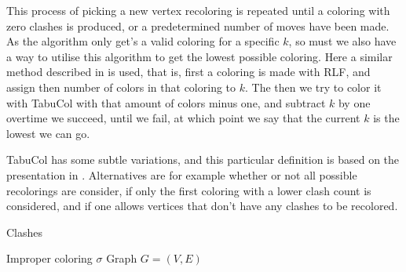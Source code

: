 \documentclass[a4paper]{article}
\begin{document}
This process of picking a new vertex recoloring is repeated until a coloring
with zero clashes is produced, or a predetermined number of moves have been
made. As the algorithm only get's a valid coloring for a specific $k$, so must
we also have a way to utilise this algorithm to get the lowest possible
coloring.  Here a similar method described in \cite{Constructive} is used, that
is, first a coloring is made with RLF, and assign then number of colors in that
coloring to $k$.  The then we try to color it with TabuCol with that amount of
colors minus one, and subtract $k$ by one overtime we succeed, until we fail, at
which point we say that the current $k$ is the lowest we can go.

TabuCol has some subtle variations, and this particular definition is based on
the presentation in \cite{Constructive}. Alternatives are for example whether or
not all possible recolorings are consider, if only the first coloring with a
lower clash count is considered, and if one allows vertices that don't have any
clashes to be recolored.

\begin{algorithm}[H]
    \caption{Clashes}
    \begin{algorithmic}[1]
        \REQUIRE Improper coloring $\sigma$
        \REQUIRE Graph $G = (V,E)$
    \end{algorithmic}
\end{algorithm}
\end{document}
